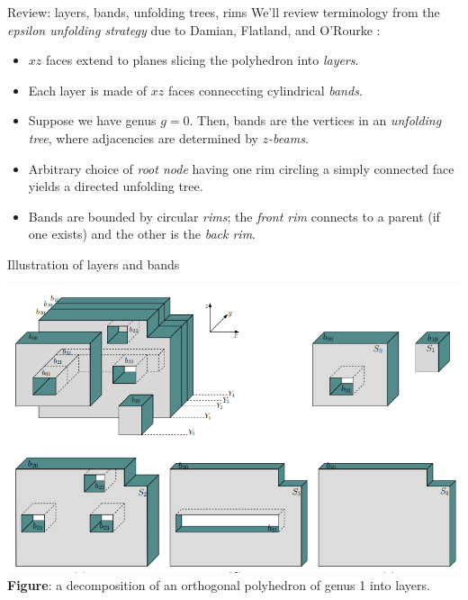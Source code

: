 \documentclass{beamer}
\theoremstyle{plain}
\begin{document}
  \begin{frame}{Review: layers, bands, unfolding trees, rims}
    We'll review terminology from the \emph{epsilon unfolding strategy} due to Damian, Flatland, and O'Rourke :
    \begin{itemize}
      \pause \item $xz$ faces extend to planes slicing the polyhedron into \emph{layers}.
      \pause \item Each layer is made of $xz$ faces conneccting cylindrical \emph{bands}.
      \pause \item Suppose we have genus $g = 0$.
        Then, bands are the vertices in an \emph{unfolding tree}, where adjacencies are determined by \emph{$z$-beams}.
      \pause \item Arbitrary choice of \emph{root node} having one rim circling a simply connected face yields a directed unfolding tree.
      \pause \item Bands are bounded by circular \emph{rims}; the \emph{front rim} connects to a parent (if one exists) and the other is the \emph{back rim}.
    \end{itemize}
  \end{frame}

  \begin{frame}{Illustration of layers and bands}
    \begin{center}
      \includegraphics[width=.9\textwidth]{./figs/Layer_decomposition.png}\\
      \tiny \textbf{Figure}: a decomposition of an orthogonal polyhedron of genus 1 into layers.
    \end{center}
  \end{frame}
\end{document}
